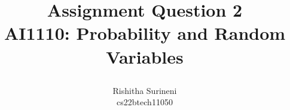\documentclass[journal,12pt,twocolumn]{IEEEtran}
\begin{document}
\let\vec\mathbf

\vspace{3cm}

\title{
\textbf{Assignment Question 2} \\ \large \textbf{AI1110}: Probability and Random Variables 


}
\author{ Rishitha Surineni\\ cs22btech11050} 

\maketitle

\newpage


\bigskip

\renewcommand{\thefigure}{\theenumi}
\renewcommand{\thetable}{\theenumi}
\end{document}
